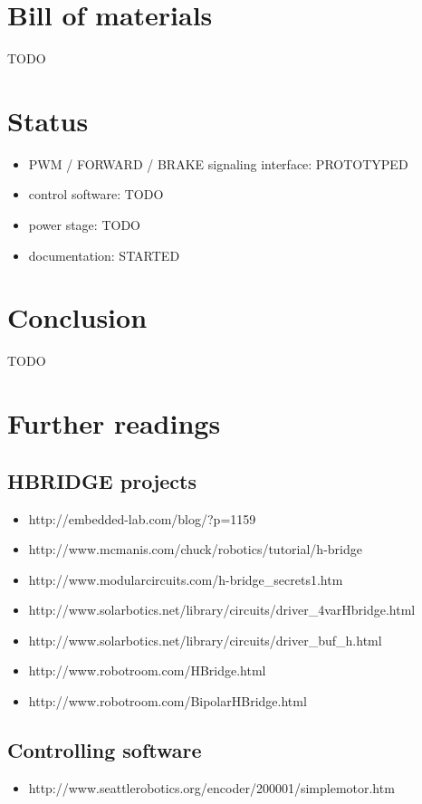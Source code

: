 \documentclass[12pt]{article}
\begin{document}
\section{Bill of materials}
TODO


\section{Status}
\begin{itemize}
  \item PWM / FORWARD / BRAKE signaling interface: PROTOTYPED
  \item control software: TODO
  \item power stage: TODO
  \item documentation: STARTED
\end{itemize}


\section{Conclusion}
TODO


\section{Further readings}

\subsection{HBRIDGE projects}
\begin{itemize}
  \item http://embedded-lab.com/blog/?p=1159
  \item http://www.mcmanis.com/chuck/robotics/tutorial/h-bridge
  \item http://www.modularcircuits.com/h-bridge\_secrets1.htm
  \item http://www.solarbotics.net/library/circuits/driver\_4varHbridge.html
  \item http://www.solarbotics.net/library/circuits/driver\_buf\_h.html
  \item http://www.robotroom.com/HBridge.html
  \item http://www.robotroom.com/BipolarHBridge.html
\end{itemize}

\subsection{Controlling software}
\begin{itemize}
  \item http://www.seattlerobotics.org/encoder/200001/simplemotor.htm
\end{itemize}


\end{document}
